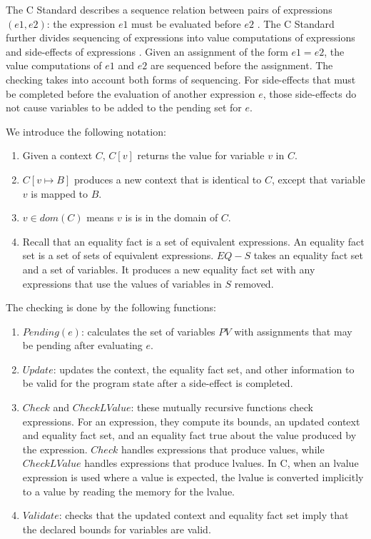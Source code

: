 The C Standard 
describes a sequence relation between pairs of expressions $(e1, e2)$:
the expression $e1$ must be evaluated before $e2$ \cite[Section 5.1.2.3]{ISO2011}.  
The C Standard
further divides sequencing of expressions into value computations
of expressions and side-effects of expressions \cite[Section 6.5, pars. 1,2]{ISO2011}.
Given an assignment of the form $e1 = e2$, 
the value computations of $e1$ and $e2$ are sequenced before the
assignment. The checking takes into account both forms of sequencing.
For side-effects that must be completed before the evaluation of another
expression $e$, those side-effects do not cause variables to
be added to the pending set for $e$.

We introduce the following notation:
\begin{enumerate}
\item Given a context $C$, $C[v]$ returns the value for variable $v$ in $C$.
\item $C[v \mapsto B]$ produces a new context that is identical to $C$,
except that variable $v$ is mapped to $B$.
\item $v \in dom(C)$ means $v$ is is in the domain of $C$.
\item Recall that an equality fact is a set of equivalent expressions.  An 
equality fact set is a set of sets of equivalent expressions.  $EQ - S$ takes
an equality fact set and a set of variables.  It produces a new equality fact
set with any expressions that use the values of variables in $S$ removed.
\end{enumerate}

The checking is done by the following functions:
\begin{enumerate}
\item $Pending(e)$: calculates the set of variables $PV$
with assignments that may be pending after evaluating $e$. 
\item $Update$: updates the context, the equality fact set,
and other information to be valid for the program state after
a side-effect is completed.
\item $Check$ and $CheckLValue$:  these mutually recursive
functions check expressions.  For an expression, they compute
its bounds, an updated context and equality fact set, and
an equality fact true about the value produced by the expression. 
$Check$ handles expressions that
produce values, while $CheckLValue$ handles expressions that produce
lvalues.  In C, when an lvalue expression is used where a value is
expected, the lvalue is converted implicitly to a value by
reading the memory for the lvalue.
\item $Validate$: checks that the updated context
and equality fact set imply that the declared bounds for
variables are valid.
\end{enumerate}

